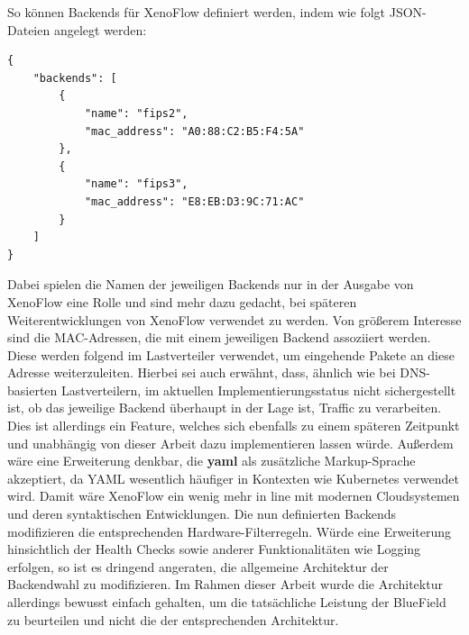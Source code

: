 So können Backends für XenoFlow definiert werden, indem wie folgt JSON-Dateien angelegt werden:
\begin{verbatim}
{
    "backends": [
        {
            "name": "fips2",
            "mac_address": "A0:88:C2:B5:F4:5A"
        },
        {
            "name": "fips3",
            "mac_address": "E8:EB:D3:9C:71:AC"
        }
    ] 
}
\end{verbatim}
Dabei spielen die Namen der jeweiligen Backends nur in der Ausgabe von XenoFlow eine Rolle und sind mehr dazu gedacht, bei späteren Weiterentwicklungen von XenoFlow verwendet zu werden. Von größerem Interesse sind die MAC-Adressen, die mit einem jeweiligen Backend assoziiert werden. Diese werden folgend im Lastverteiler verwendet, um eingehende Pakete an diese Adresse weiterzuleiten. Hierbei sei auch erwähnt, dass, ähnlich wie bei DNS-basierten Lastverteilern, im aktuellen Implementierungsstatus nicht sichergestellt ist, ob das jeweilige Backend überhaupt in der Lage ist, Traffic zu verarbeiten. Dies ist allerdings ein Feature, welches sich ebenfalls zu einem späteren Zeitpunkt und unabhängig von dieser Arbeit dazu implementieren lassen würde. Außerdem wäre eine Erweiterung denkbar, die \textbf{yaml} als zusätzliche Markup-Sprache akzeptiert, da YAML wesentlich häufiger in Kontexten wie Kubernetes verwendet wird. Damit wäre XenoFlow ein wenig mehr in line mit modernen Cloudsystemen und deren syntaktischen Entwicklungen.
\newline
Die nun definierten Backends modifizieren die entsprechenden Hardware-Filterregeln. Würde eine Erweiterung hinsichtlich der Health Checks sowie anderer Funktionalitäten wie Logging erfolgen, so ist es dringend angeraten, die allgemeine Architektur der Backendwahl zu modifizieren. Im Rahmen dieser Arbeit wurde die Architektur allerdings bewusst einfach gehalten, um die tatsächliche Leistung der BlueField zu beurteilen und nicht die der entsprechenden Architektur.
